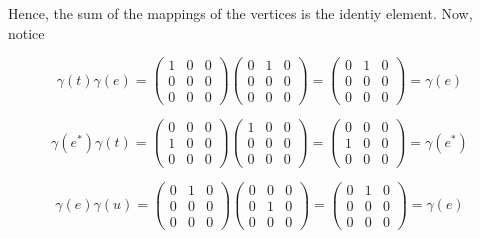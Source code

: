 \begin{solution}
    Hence, the sum of the mappings of the vertices is the identiy element. Now, notice

    $$\gamma(t)\gamma(e)=\left(\begin{array}{ccc} 1 & 0 & 0 \\ 0 & 0 & 0 \\ 0 & 0 & 0 \end{array}\right)
    \left(\begin{array}{ccc} 0 & 1 & 0 \\ 0 & 0 & 0 \\ 0 & 0 & 0 \end{array}\right)
    =\left(\begin{array}{ccc} 0 & 1 & 0 \\ 0 & 0 & 0 \\ 0 & 0 & 0 \end{array}\right)=\gamma(e)$$

    $$\gamma(e^*)\gamma(t)=
    \left(\begin{array}{ccc} 0 & 0 & 0 \\ 1 & 0 & 0 \\ 0 & 0 & 0 \end{array}\right)
    \left(\begin{array}{ccc} 1 & 0 & 0 \\ 0 & 0 & 0 \\ 0 & 0 & 0 \end{array}\right)
    =\left(\begin{array}{ccc} 0 & 0 & 0 \\ 1 & 0 & 0 \\ 0 & 0 & 0 \end{array}\right)=\gamma(e^*)$$

    $$\gamma(e)\gamma(u)=\left(\begin{array}{ccc} 0 & 1 & 0 \\ 0 & 0 & 0 \\ 0 & 0 & 0 \end{array}\right)
    \left(\begin{array}{ccc} 0 & 0 & 0 \\ 0 & 1 & 0 \\ 0 & 0 & 0 \end{array}\right)
    =\left(\begin{array}{ccc} 0 & 1 & 0 \\ 0 & 0 & 0 \\ 0 & 0 & 0 \end{array}\right)=\gamma(e)$$


\end{solution}

